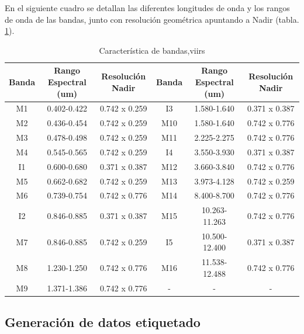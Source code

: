 En el siguiente cuadro se detallan las diferentes longitudes de onda y los rangos de onda de las bandas, junto con resolución geométrica apuntando a Nadir (tabla. \ref{tab:viirs}).
\begin{table}[H]
\begin{center}
\begin{tabular}{|c|c|c||c|c|c|}
\hline \textbf{Banda} & Rango Espectral (um) & Resolución Nadir & \textbf{Banda} & Rango Espectral (um) & Resolución Nadir \\\hline 
 		M1  & 0.402-0.422   & 0.742 x 0.259 & I3  & 1.580-1.640   & 0.371 x 0.387 \\ \hline 
		M2  & 0.436-0.454   & 0.742 x 0.259 & M10 & 1.580-1.640   & 0.742 x 0.776 \\ \hline 
		M3  & 0.478-0.498   & 0.742 x 0.259 & M11 & 2.225-2.275   & 0.742 x 0.776 \\ \hline 
		M4  & 0.545-0.565   & 0.742 x 0.259 & I4  & 3.550-3.930   & 0.371 x 0.387 \\ \hline 
		I1  & 0.600-0.680   & 0.371 x 0.387 & M12 & 3.660-3.840   & 0.742 x 0.776 \\ \hline 
		M5  & 0.662-0.682   & 0.742 x 0.259 & M13 & 3.973-4.128   & 0.742 x 0.259 \\ \hline 
		M6  & 0.739-0.754   & 0.742 x 0.776 & M14 & 8.400-8.700   & 0.742 x 0.776 \\ \hline 
		I2  & 0.846-0.885   & 0.371 x 0.387 & M15 & 10.263-11.263 & 0.742 x 0.776 \\ \hline 
		M7  & 0.846-0.885   & 0.742 x 0.259 & I5  & 10.500-12.400 & 0.371 x 0.387 \\ \hline 
		M8  & 1.230-1.250   & 0.742 x 0.776 & M16 & 11.538-12.488 & 0.742 x 0.776 \\ \hline 
		M9  & 1.371-1.386   & 0.742 x 0.776 & - &-&- \\ \hline 
\end{tabular}
\end{center}\caption{Característica de bandas,\ac{viirs} \label{tab:viirs}}
\end{table}

\subsection{Generación de datos etiquetado}\label{sub:generacion_datos_etiquetado}

